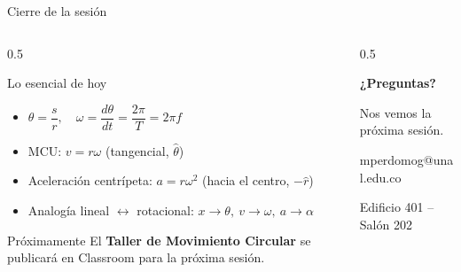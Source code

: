 \documentclass[aspectratio=169,xcolor=dvipsnames]{beamer}
\begin{document}
	\begin{frame}{Cierre de la sesión}
		\begin{columns}[T]
			\begin{column}{0.5\textwidth}
				\begin{block}{Lo esencial de hoy}
					\small
					\begin{itemize}
						\item $\theta = \dfrac{s}{r}, \quad \omega = \dfrac{d\theta}{dt} = \dfrac{2\pi}{T} = 2\pi f$
						\item MCU: $v = r\omega$ (tangencial, $\hat\theta$)
						\item Aceleración centrípeta: $a = r\omega^2$ (hacia el centro, $-\hat r$)
						\item Analogía lineal $\leftrightarrow$ rotacional: $x\to\theta,\ v\to\omega,\ a\to\alpha$
					\end{itemize}
				\end{block}
				
				\vspace{0.25cm}
				\begin{exampleblock}{Próximamente}
					\small
					El \textbf{Taller de Movimiento Circular} se publicará en Classroom para la próxima sesión.
				\end{exampleblock}
			\end{column}
			\begin{column}{0.5\textwidth}
				\begin{center}
					\vspace{0.3cm}
					\Large \textbf{¿Preguntas?}
					
					\vspace{0.8cm}
					\normalsize
					Nos vemos la próxima sesión.
					
					\vspace{0.6cm}
					mperdomog@unal.edu.co
					
					\vspace{0.2cm}
					Edificio 401 -- Salón 202
				\end{center}
			\end{column}
		\end{columns}
	\end{frame}
	
\end{document}
